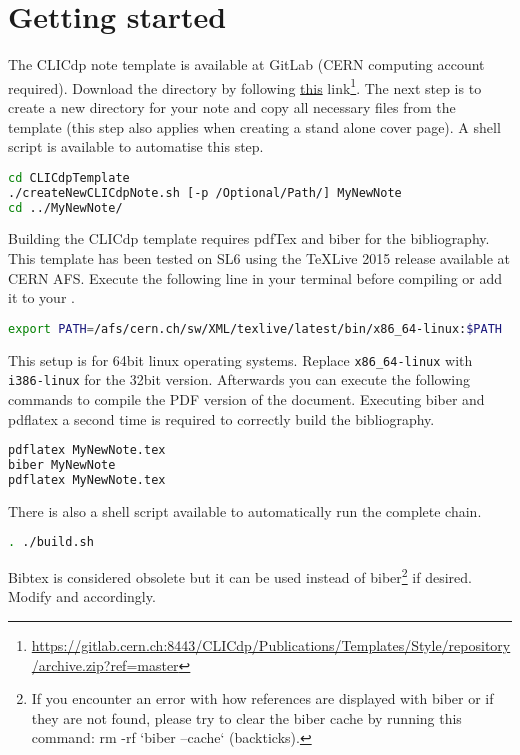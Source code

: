 \section{Getting started}
\label{sec:basics}
The CLICdp note \latex template is available at GitLab (CERN computing account required). Download the directory by following \href{https://gitlab.cern.ch:8443/CLICdp/Publications/Templates/Style/repository/archive.zip?ref=master}{this} link\footnote{\href{https://gitlab.cern.ch:8443/CLICdp/Publications/Templates/Style/repository/archive.zip?ref=master}{https://gitlab.cern.ch:8443/CLICdp/Publications/Templates/Style/repository/archive.zip?ref=master}}. The next step is to create a new directory for your note and copy all necessary files from the template (this step also applies when creating a stand alone cover page). A shell script is available to automatise this step.
\begin{lstlisting}[language=bash]
cd CLICdpTemplate
./createNewCLICdpNote.sh [-p /Optional/Path/] MyNewNote
cd ../MyNewNote/
\end{lstlisting}
Building the CLICdp template requires pdfTex and biber for the bibliography. This template has been tested on SL6 using the TeXLive 2015 release available at CERN AFS. Execute the following line in your terminal before compiling or add it to your .
\begin{lstlisting}[language=bash]
export PATH=/afs/cern.ch/sw/XML/texlive/latest/bin/x86_64-linux:$PATH
\end{lstlisting}
This setup is for 64bit linux operating systems. Replace \texttt{x86\_64-linux} with \texttt{i386-linux} for the 32bit version.
Afterwards you can execute the following commands to compile the PDF version of the document. Executing biber and pdflatex a second time is required to correctly build the bibliography.
\begin{lstlisting}[language=bash]
pdflatex MyNewNote.tex
biber MyNewNote
pdflatex MyNewNote.tex
\end{lstlisting}
There is also a shell script available to automatically run the complete chain.
\begin{lstlisting}[language=bash]
. ./build.sh
\end{lstlisting}
Bibtex is considered obsolete but it can be used instead of biber\footnote{If you encounter an error with how references are displayed with biber or if they are not found, please try to clear the biber cache by running this command: rm -rf `biber --cache` (backticks).} if desired. Modify  and  accordingly.

